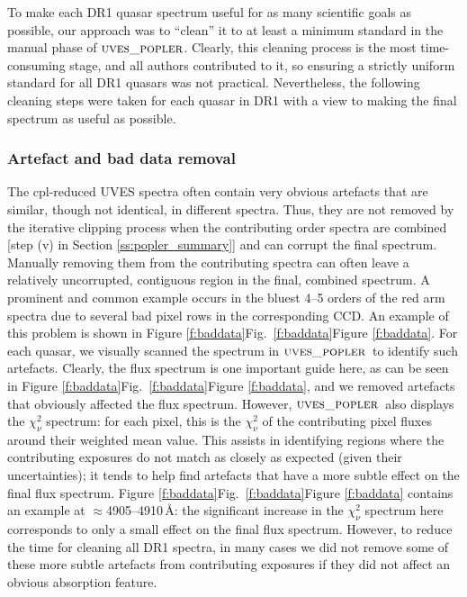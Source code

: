 \documentclass[fleqn,usenatbib,usedcolumn]{mnras}
\newcommand{\Sref}[1]{Section \ref{#1}}
\newcommand{\Fref}[1]{\ifhmode \ifnum\spacefactor=1001 Figure \ref{#1}\else Fig.\ \ref{#1}\fi \else Figure \ref{#1}\fi}
\newcommand{\popler}{\ensuremath{\textsc{uves\_popler}}}
\begin{document}
To make each DR1 quasar spectrum useful for as many scientific goals as possible, our approach was to ``clean'' it to at least a minimum standard in the manual phase of \popler. Clearly, this cleaning process is the most time-consuming stage, and all authors contributed to it, so ensuring a strictly uniform standard for all DR1 quasars was not practical. Nevertheless, the following cleaning steps were taken for each quasar in DR1 with a view to making the final spectrum as useful as possible.

\subsubsection{Artefact and bad data removal}\label{sss:artefacts}

The {\sc cpl}-reduced UVES spectra often contain very obvious artefacts that are similar, though not identical, in different spectra. Thus, they are not removed by the iterative clipping process when the contributing order spectra are combined [step (v) in \Sref{ss:popler_summary}] and can corrupt the final spectrum. Manually removing them from the contributing spectra can often leave a relatively uncorrupted, contiguous region in the final, combined spectrum. A prominent and common example occurs in the bluest 4--5 orders of the red arm spectra due to several bad pixel rows in the corresponding CCD. An example of this problem is shown in \Fref{f:baddata}. For each quasar, we visually scanned the spectrum in \popler\ to identify such artefacts. Clearly, the flux spectrum is one important guide here, as can be seen in \Fref{f:baddata}, and we removed artefacts that obviously affected the flux spectrum. However, \popler\ also displays the $\chi_\nu^2$ spectrum: for each pixel, this is the $\chi_\nu^2$ of the contributing pixel fluxes around their weighted mean value. This assists in identifying regions where the contributing exposures do not match as closely as expected (given their uncertainties); it tends to help find artefacts that have a more subtle effect on the final flux spectrum. \Fref{f:baddata} contains an example at $\approx$4905--4910\,\AA: the significant increase in the $\chi_\nu^2$ spectrum here corresponds to only a small effect on the final flux spectrum. However, to reduce the time for cleaning all DR1 spectra, in many cases we did not remove some of these more subtle artefacts from contributing exposures if they did not affect an obvious absorption feature.
\end{document}
